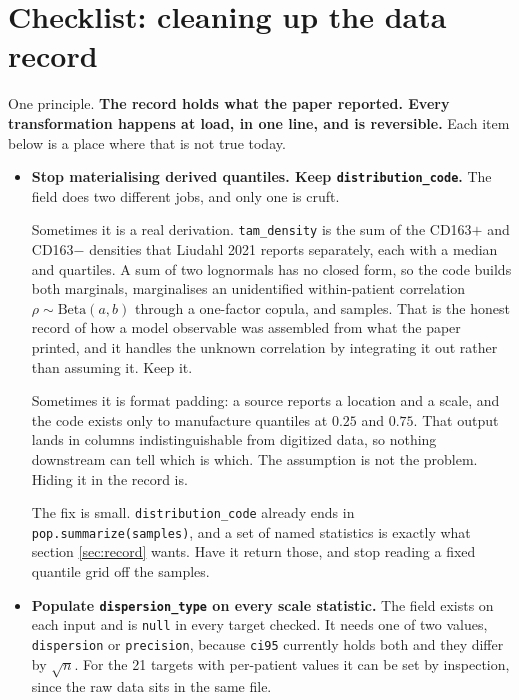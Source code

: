 \documentclass[11pt]{article}
\begin{document}
\section{Checklist: cleaning up the data record}

One principle. \textbf{The record holds what the paper reported. Every
transformation happens at load, in one line, and is reversible.} Each item below
is a place where that is not true today.

\begin{itemize}[label={},leftmargin=1.6em]

\item[$\square$] \textbf{Stop materialising derived quantiles. Keep
\texttt{distribution\_code}.} The field does two different jobs, and only one is
cruft.

Sometimes it is a real derivation. \texttt{tam\_density} is the sum of the
CD163$+$ and CD163$-$ densities that Liudahl 2021 reports separately, each with a
median and quartiles. A sum of two lognormals has no closed form, so the code
builds both marginals, marginalises an unidentified within-patient correlation
$\rho\sim\mathrm{Beta}(a,b)$ through a one-factor copula, and samples. That is the
honest record of how a model observable was assembled from what the paper
printed, and it handles the unknown correlation by integrating it out rather than
assuming it. Keep it.

Sometimes it is format padding: a source reports a location and a scale, and the
code exists only to manufacture quantiles at $0.25$ and $0.75$. That output lands
in columns indistinguishable from digitized data, so nothing downstream can tell
which is which. The assumption is not the problem. Hiding it in the record is.

The fix is small. \texttt{distribution\_code} already ends in
\texttt{pop.summarize(samples)}, and a set of named statistics is exactly what
section \ref{sec:record} wants. Have it return those, and stop reading a fixed
quantile grid off the samples.

\item[$\square$] \textbf{Populate \texttt{dispersion\_type} on every scale
statistic.} The field exists on each input and is \texttt{null} in every target
checked. It needs one of two values, \texttt{dispersion} or \texttt{precision},
because \texttt{ci95} currently holds both and they differ by $\sqrt n$. For the
21 targets with per-patient values it can be set by inspection, since the raw
data sits in the same file.


\end{itemize}
\end{document}
